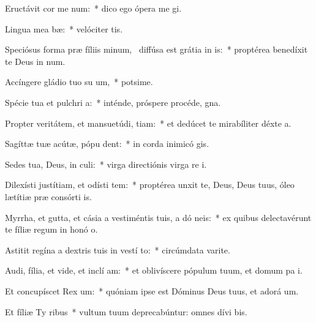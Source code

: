 \item Eructávit cor me  num:~* dico ego ópera me gi.
\item Lingua mea  bæ:~* velóciter tis.
\item Speciósus forma præ fíliis minum,~\pscross{} diffúsa est grátia in  is:~* proptérea benedíxit te Deus in num.
\item Accíngere gládio tuo su  um,~* potsime.
\item Spécie tua et pulchri a:~* inténde, próspere procéde,  gna.
\item Propter veritátem, et mansuetúdi,  tiam:~* et dedúcet te mirabíliter déxte a.
\item Sagíttæ tuæ acútæ, pópu   dent:~* in corda inimicó gis.
\item Sedes tua, Deus, in  culi:~* virga directiónis virga re i.
\item Dilexísti justítiam, et odísti tem:~* proptérea unxit te, Deus, Deus tuus, óleo lætítiæ præ consórti is.
\item Myrrha, et gutta, et cásia a vestiméntis tuis, a dó neis:~* ex quibus delectavérunt te fíliæ regum in honó o.
\item Astitit regína a dextris tuis in vestí to:~* circúmdata varite.
\item Audi, fília, et vide, et inclí  am:~* et oblivíscere pópulum tuum, et domum pa i.
\item Et concupíscet Rex  um:~* quóniam ipse est Dóminus Deus tuus, et adorá um.
\item Et fíliæ Ty  ribus~* vultum tuum deprecabúntur: omnes dívi bis.
